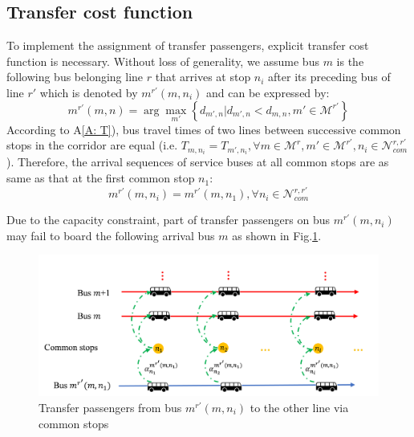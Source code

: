 \documentclass[smallextended]{svjour3}       %
\begin{document}
\begin{Abstract}
\subsection{Transfer cost function}
To implement the assignment of transfer passengers, explicit transfer cost function is necessary. 
Without loss of generality, we assume bus $m$ is the following bus belonging line $r$ that arrives at stop $n_{i}$ 
after its preceding bus of line $r'$ which is denoted by $m^{r'}(m,n_{i})$ and can be expressed by: 
\begin{equation}
    m^{r'}\left(m,n\right)=\arg \max_{m'} \left\{d_{m',n} | d_{m',n} < d_{m,n},m'\in\mathcal{M}^{r'}\right\}
\end{equation}
According to A\ref{A: T}), bus travel times of two lines between successive common stops in the corridor are equal 
(i.e. $T_{m,n_{i}}=T_{m',n_{i}},\forall m\in\mathcal{M}^{r},m'\in\mathcal{M}^{r'},n_{i}\in \mathcal{N}_{com}^{r,r'}$).
Therefore, the arrival sequences of service buses at all common stops are as same as that at the first common stop $n_{1}$:
\begin{equation}
    m^{r'}\left(m,n_{i}\right)=m^{r'}\left(m,n_{1}\right), \forall n_{i} \in \mathcal{N}_{com}^{r,r'}
\end{equation} 

Due to the capacity constraint, 
part of transfer passengers on bus $m^{r'}(m,n_{i})$ may fail to board the following arrival bus $m$
as shown in Fig.\ref{fig:trans in common stop}.
\begin{figure}[H]
    \centering
    \includegraphics[width=1\linewidth]{CASPT2021paper_fig/trans in common stop.png}
    \caption{Transfer passengers from bus $m^{r'}(m,n_{i})$ to the other line via common stops}
    \label{fig:trans in common stop}
\end{figure}


\end{Abstract}
\end{document}
